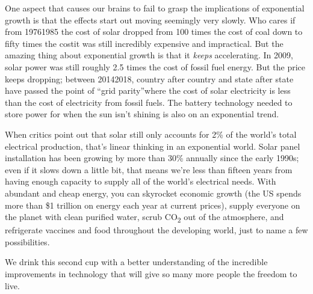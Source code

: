 {  One aspect that causes our brains to fail to grasp the implications of
  exponential growth is that the effects start out moving seemingly very slowly.
  Who cares if from 1976\textendash{}1985 the cost of solar dropped from 100
  times the cost of coal down to fifty times the cost\textemdash{}it was still
  incredibly expensive and impractical. But the amazing thing about exponential
  growth is that it \textit{keeps} accelerating. In 2009, solar power was still
  roughly 2.5 times the cost of fossil fuel energy.  But the price keeps
  dropping; between 2014\textendash{}2018, country after country and state after
  state have passed the point of ``grid parity''\textemdash{}where the cost of
  solar electricity is less than the cost of electricity from fossil fuels. The
  battery technology needed to store power for when the sun isn't shining is
  also on an exponential trend.

  \newReading When critics point out that solar still only accounts for 2\% of
  the world's total electrical production, that's linear thinking in an
  exponential world. Solar panel installation has been growing by more than 30\%
  annually since the early 1990s; even if it slows down a little bit, that means
  we're less than fifteen years from having enough capacity to supply all of the
  world's electrical needs. With abundant and cheap energy, you can skyrocket
  economic growth (the US spends more than \$1 trillion on energy each year at
  current prices), supply everyone on the planet with clean purified water,
  scrub CO\textsubscript{2} out of the atmosphere, and refrigerate vaccines and
  food throughout the developing world, just to name a few possibilities.

  We drink this second cup with a better understanding of the incredible
  improvements in technology that will give so many more people the freedom to
  live.

}

